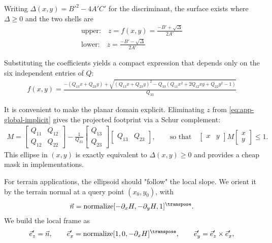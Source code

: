 Writing $\Delta(x,y)=B'^2-4A'C'$ for the discriminant, the surface exists where $\Delta\ge 0$ and the two shells are
\begin{align}
    \label{eq:app-upper}
    \text{upper:}\quad z = f(x,y) = \frac{-B' + \sqrt{ \Delta }}{ 2A' } \\
    \label{eq:app-lower}
    \text{lower:}\quad z = \frac{-B' - \sqrt{\Delta}}{2A'}
\end{align}

Substituting the coefficients yields a compact expression that depends only on the six independent entries of $Q$:
\begin{align}
    \label{eq:app-upper-final}
    f(x,y)=
    \frac{
    -(Q_{13}x+Q_{23}y)
    +\sqrt{(Q_{13}x+Q_{23}y)^2 - Q_{33} \left(Q_{11}x^2 + 2Q_{12}xy + Q_{22}y^2 - 1\right)}
    }{Q_{33}}
\end{align}


It is convenient to make the planar domain explicit. Eliminating $z$ from \cref{eq:app-global-implicit} gives the projected footprint via a Schur complement:
\begin{align}
    M =
    \begin{bmatrix}
    Q_{11} & Q_{12}\\
    Q_{12} & Q_{22}
    \end{bmatrix}
    -
    \frac{1}{Q_{33}}
    \begin{bmatrix}
    Q_{13}\\ Q_{23}
    \end{bmatrix}
    \begin{bmatrix}
    Q_{13} & Q_{23}
    \end{bmatrix},
    \qquad
    \text{so that}\quad
    \begin{bmatrix}x & y\end{bmatrix} M \begin{bmatrix}x\\ y\end{bmatrix} \le 1.
\end{align}
This ellipse in $(x,y)$ is exactly equivalent to $\Delta(x,y)\ge 0$ and provides a cheap mask in implementations.

For terrain applications, the ellipsoid should "follow" the local slope. We orient it by the terrain normal at a query point $(x_0,y_0)$, with
\begin{align}
    \label{eq:app-terrain-normal}
    \vec n=\operatorname{normalize} [-\partial_x H, -\partial_y H, 1]^\transpose .
\end{align}
We build the local frame as
\begin{align}
    \vec e_z'=\vec n,
    \qquad
    \vec e_x'=\operatorname{normalize} [1,0,-\partial_x H]^\transpose ,
    \qquad
    \vec e_y'=\vec e_z'\times \vec e_x',
\end{align}

